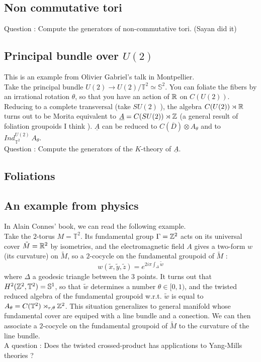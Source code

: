 \subsection{Non commutative tori}

Question : Compute the generators of non-commutative tori. (Sayan did it)
\subsection{Principal bundle over $U(2)$}
This is an example from Olivier Gabriel's talk in Montpellier. \\

Take the principal bundle $U(2)\rightarrow U(2)/\mathbb T^2\simeq \mathbb S^2$. You can foliate the fibers by an irrational rotation $\theta$, so that you have an action of $\mathbb R$ on $C(U(2))$. Reducing to a complete transversal (take $SU(2)$ ), the algebra $C(U(2))\rtimes \mathbb R$ turns out to be Morita equivalent to $\underline A= C(SU(2))\rtimes \mathbb Z$ (a general result of foliation groupoids I think ). $\underline A$ can be reduced to $C(\overline D)\otimes A_\theta$ and to $Ind_{\mathbb T^2}^{U(2)}\ A_\theta$.\\

Question : Compute the generators of the $K$-theory of $\underline A$.

\subsection{Foliations}
\subsection{An example from physics}
In Alain Connes' book, we can read the following example.\\

Take the $2$-torus $M=\mathbb T^2$. Its fundamental group $\Gamma=\mathbb Z^2$ acts on its universal cover $\tilde M=\mathbb R^2$ by isometries, and the electromagnetic field $A$ gives a two-form $w$ (its curvature) on $\tilde M$, so a $2$-cocycle on the fundamental groupoid of $\tilde M$ :
\[w(\tilde x,\tilde y,\tilde z)=e^{2i\pi \int_{\Delta}\tilde w}\]
where $\Delta$ a geodesic triangle between the $3$ points. It turns out that $H^2(\mathbb Z^2,\mathbb T^2)=\mathbb S^1$, so that $\tilde w$ determines a number $\theta\in [0,1)$, and the twisted reduced algebra of the fundamental groupoid w.r.t. $\tilde w$ is equal to $A_\theta=C(\mathbb T^2 )\rtimes_{r,\theta} \mathbb Z^2$. This situation generalizes to general manifold whose fundamental cover are equiped with a line bundle and a conection. We can then associate a $2$-cocycle on the fundamental groupoid of $\tilde M$ to the curvature of the line bundle. \\

A question : Does the twisted crossed-product has applications to Yang-Mills theories ?
